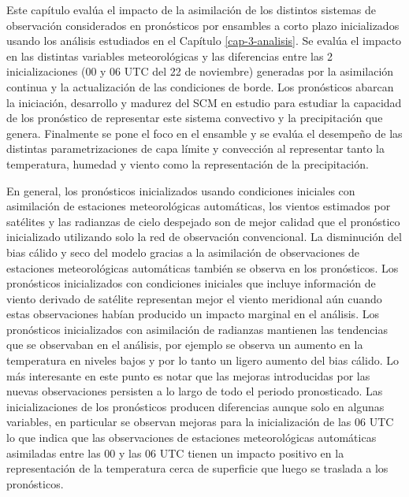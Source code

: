 \documentclass[12pt,oneside,a4paper]{reedthesis}
\begin{document}
Este capítulo evalúa el impacto de la asimilación de los distintos sistemas de observación considerados en pronósticos por ensambles a corto plazo inicializados usando los análisis estudiados en el Capítulo \ref{cap-3-analisis}. Se evalúa el impacto en las distintas variables meteorológicas y las diferencias entre las 2 inicializaciones (00 y 06 UTC del 22 de noviembre) generadas por la asimilación continua y la actualización de las condiciones de borde. Los pronósticos abarcan la iniciación, desarrollo y madurez del SCM en estudio para estudiar la capacidad de los pronóstico de representar este sistema convectivo y la precipitación que genera. Finalmente se pone el foco en el ensamble y se evalúa el desempeño de las distintas parametrizaciones de capa límite y convección al representar tanto la temperatura, humedad y viento como la representación de la precipitación.

En general, los pronósticos inicializados usando condiciones iniciales con asimilación de estaciones meteorológicas automáticas, los vientos estimados por satélites y las radianzas de cielo despejado son de mejor calidad que el pronóstico inicializado utilizando solo la red de observación convencional. La disminución del bias cálido y seco del modelo gracias a la asimilación de observaciones de estaciones meteorológicas automáticas también se observa en los pronósticos. Los pronósticos inicializados con condiciones iniciales que incluye información de viento derivado de satélite representan mejor el viento meridional aún cuando estas observaciones habían producido un impacto marginal en el análisis. Los pronósticos inicializados con asimilación de radianzas mantienen las tendencias que se observaban en el análisis, por ejemplo se observa un aumento en la temperatura en niveles bajos y por lo tanto un ligero aumento del bias cálido. Lo más interesante en este punto es notar que las mejoras introducidas por las nuevas observaciones persisten a lo largo de todo el periodo pronosticado. Las inicializaciones de los pronósticos producen diferencias aunque solo en algunas variables, en particular se observan mejoras para la inicialización de las 06 UTC lo que indica que las observaciones de estaciones meteorológicas automáticas asimiladas entre las 00 y las 06 UTC tienen un impacto positivo en la representación de la temperatura cerca de superficie que luego se traslada a los pronósticos.
\end{document}
